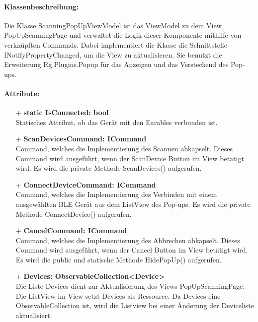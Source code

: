 \documentclass[a4paper,12pt]{article}
\begin{document}
	\paragraph{Klassenbeschreibung:}
	Die Klasse ScanningPopUpViewModel ist das ViewModel zu dem View PopUpScanningPage und verwaltet die Logik dieser Komponente mithilfe von verknüpften Commands. Dabei implementiert die Klasse die Schnittstelle INotifyPropertyChanged, um die View zu aktualisieren.
	Sie benutzt die Erweiterung \Gls{Rg.Plugins.Popup} für das Anzeigen und das Versteckend des Pop-ups.
	
	\paragraph{Attribute:}
	\begin{itemize}
		\item[+] \textbf{static IsConnected: bool}\\Statisches Attribut, ob das Gerät mit den \gls{Earables} verbunden ist.
		\item[+] \textbf{ScanDevicesCommand: ICommand}\\Command, welches die Implementierung des Scannen abkapselt. Dieses Command wird ausgeführt, wenn der ScanDevice Button im View betätigt wird. Es wird die private Methode ScanDevices() aufgerufen.
		\item[+] \textbf{ConnectDeviceCommand: ICommand}\\Command, welches die Implementierung des Verbinden mit einem ausgewählten BLE Gerät aus dem ListView des Pop-ups. Es wird die private Methode ConnectDevice() aufgerufen.
		\item[+] \textbf{CancelCommand: ICommand}\\Command, welches die Implementierung des Abbrechen abkapselt. Dieses Command wird ausgeführt, wenn der Cancel Button im View betätigt wird. Es wird die public und statische Methode HidePopUp() aufgerufen. 
		\item[+] \textbf{Devices: ObservableCollection<Device>}\\Die Liste Devices dient zur Aktualisierung des Views PopUpScanningPage. Die ListView im View setzt Devices als Ressource. Da Devices eine ObservableCollection ist, wird die Listview bei einer Änderung der Deviceliste aktualisiert.
	\end{itemize}
\end{document}
